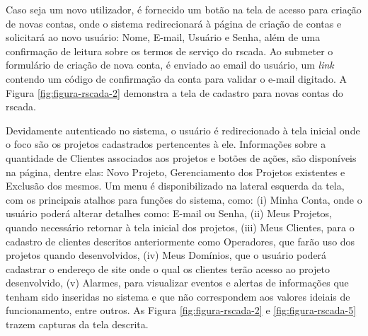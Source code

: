 Caso seja um novo utilizador, é fornecido um botão na tela de acesso para criação de novas contas, onde o sistema redirecionará à página de criação de contas e solicitará ao novo usuário: Nome, E-mail, Usuário e Senha, além de uma confirmação de leitura sobre os termos de serviço do rscada. Ao submeter o formulário de criação de nova conta, é enviado ao email do usuário, um \textit{link} contendo um código de confirmação da conta para validar o e-mail digitado. A Figura \ref{fig:figura-rscada-2} demonstra a tela de cadastro para novas contas do rscada.

        \begin{figure}[!h]
    	\end{figure}

Devidamente autenticado no sistema, o usuário é redirecionado à tela inicial onde o foco são os projetos cadastrados pertencentes à ele. Informações sobre a quantidade de Clientes associados aos projetos e botões de ações, são disponíveis na página, dentre elas: Novo Projeto, Gerenciamento dos Projetos existentes e Exclusão dos mesmos. Um menu é disponibilizado na lateral esquerda da tela, com os principais atalhos para funções do sistema, como: (i) Minha Conta, onde o usuário poderá alterar detalhes como: E-mail ou Senha, (ii) Meus Projetos, quando necessário retornar à tela inicial dos projetos, (iii) Meus Clientes, para o cadastro de clientes descritos anteriormente como Operadores, que farão uso dos projetos quando desenvolvidos, (iv) Meus Domínios, que o usuário poderá cadastrar o endereço de site onde o qual os clientes terão acesso ao projeto desenvolvido, (v) Alarmes, para visualizar eventos e alertas de informações que tenham sido inseridas no sistema e que não correspondem aos valores ideiais de funcionamento, entre outros. As Figura \ref{fig:figura-rscada-2} e \ref{fig:figura-rscada-5} trazem capturas da tela descrita.

